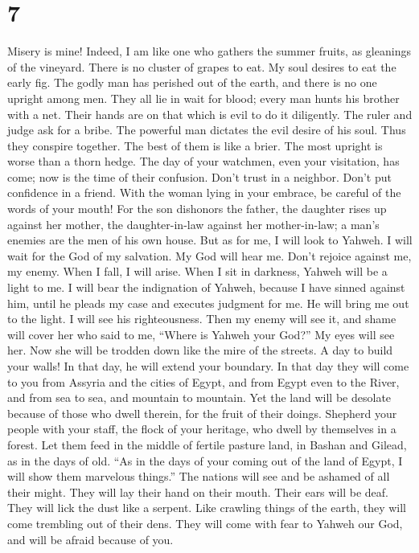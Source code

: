\hypertarget{section-6}{%
\section{7}\label{section-6}}

 Misery is mine! Indeed, I am like one who gathers the
summer fruits, as gleanings of the vineyard. There is no cluster of
grapes to eat. My soul desires to eat the early fig.  The
godly man has perished out of the earth, and there is no one upright
among men. They all lie in wait for blood; every man hunts his brother
with a net.  Their hands are on that which is evil to do
it diligently. The ruler and judge ask for a bribe. The powerful man
dictates the evil desire of his soul. Thus they conspire together.
 The best of them is like a brier. The most upright is
worse than a thorn hedge. The day of your watchmen, even your
visitation, has come; now is the time of their confusion. 
Don't trust in a neighbor. Don't put confidence in a friend. With the
woman lying in your embrace, be careful of the words of your mouth!
 For the son dishonors the father, the daughter rises up
against her mother, the daughter-in-law against her mother-in-law; a
man's enemies are the men of his own house.  But as for
me, I will look to Yahweh. I will wait for the God of my salvation. My
God will hear me.  Don't rejoice against me, my enemy.
When I fall, I will arise. When I sit in darkness, Yahweh will be a
light to me.  I will bear the indignation of Yahweh,
because I have sinned against him, until he pleads my case and executes
judgment for me. He will bring me out to the light. I will see his
righteousness.  Then my enemy will see it, and shame will
cover her who said to me, ``Where is Yahweh your God?'' My eyes will see
her. Now she will be trodden down like the mire of the streets.
 A day to build your walls! In that day, he will extend
your boundary.  In that day they will come to you from
Assyria and the cities of Egypt, and from Egypt even to the River, and
from sea to sea, and mountain to mountain.  Yet the land
will be desolate because of those who dwell therein, for the fruit of
their doings.  Shepherd your people with your staff, the
flock of your heritage, who dwell by themselves in a forest. Let them
feed in the middle of fertile pasture land, in Bashan and Gilead, as in
the days of old.  ``As in the days of your coming out of
the land of Egypt, I will show them marvelous things.'' 
The nations will see and be ashamed of all their might. They will lay
their hand on their mouth. Their ears will be deaf.  They
will lick the dust like a serpent. Like crawling things of the earth,
they will come trembling out of their dens. They will come with fear to
Yahweh our God, and will be afraid because of you.

